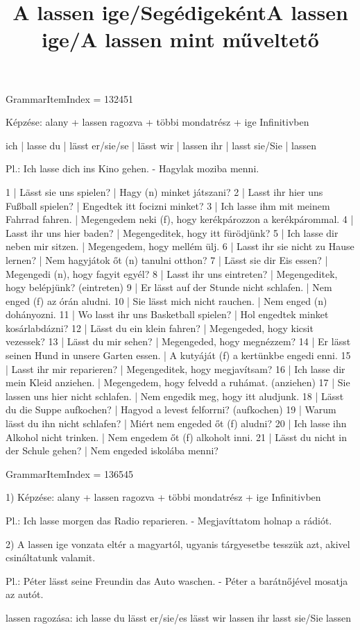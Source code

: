 \title{A lassen ige/Segédigeként}

GrammarItemIndex = 132451

\begin{desc}
Képzése:
alany + lassen ragozva + többi mondatrész + ige Infinitivben

ich       | lasse
du        | lässt
er/sie/se | lässt
wir       | lassen
ihr       | lasst
sie/Sie   | lassen

Pl.: Ich lasse dich ins Kino gehen. - Hagylak moziba menni.
\end{desc}

\begin{exmp}
1 | Lässt sie uns spielen? | Hagy (n) minket játszani?
2 | Lasst ihr hier uns Fußball spielen? | Engedtek itt focizni minket?
3 | Ich lasse ihm mit meinem Fahrrad fahren. | Megengedem neki (f), hogy kerékpározzon a kerékpárommal.
4 | Lasst ihr uns hier baden? | Megengeditek, hogy itt fürödjünk?
5 | Ich lasse dir neben mir sitzen. | Megengedem, hogy mellém ülj.
6 | Lasst ihr sie nicht zu Hause lernen? | Nem hagyjátok őt (n) tanulni otthon?
7 | Lässt sie dir Eis essen? | Megengedi (n), hogy fagyit egyél?
8 | Lasst ihr uns eintreten? | Megengeditek, hogy belépjünk? (eintreten)
9 | Er lässt auf der Stunde nicht schlafen. | Nem enged (f) az órán aludni.
10 | Sie lässt mich nicht rauchen. | Nem enged (n) dohányozni.
11 | Wo lasst ihr uns Basketball spielen? | Hol engedtek minket kosárlabdázni?
12 | Lässt du ein klein fahren? | Megengeded, hogy kicsit vezessek?
13 | Lässt du mir sehen? | Megengeded, hogy megnézzem?
14 | Er lässt seinen Hund in unsere Garten essen. | A kutyáját (f) a kertünkbe engedi enni.
15 | Lasst ihr mir reparieren? | Megengeditek, hogy megjavítsam?
16 | Ich lasse dir mein Kleid anziehen. | Megengedem, hogy felvedd a ruhámat. (anziehen)
17 | Sie lassen uns hier nicht schlafen. | Nem engedik meg, hogy itt aludjunk.
18 | Lässt du die Suppe aufkochen? | Hagyod a levest felforrni? (aufkochen)
19 | Warum lässt du ihn nicht schlafen? | Miért nem engeded őt (f) aludni?
20 | Ich lasse ihn Alkohol nicht trinken. | Nem engedem őt (f) alkoholt inni.
21 | Lässt du nicht in der Schule gehen? | Nem engeded iskolába menni?
\end{exmp}

\title{A lassen ige/A lassen mint műveltető}

GrammarItemIndex = 136545

\begin{desc}
1) Képzése: alany + lassen ragozva + többi mondatrész + ige Infinitivben 

Pl.: Ich lasse morgen das Radio reparieren. - Megjavíttatom holnap a rádiót.

2) A lassen ige vonzata eltér a magyartól, ugyanis tárgyesetbe tesszük
azt, akivel csináltatunk valamit.

Pl.: Péter lässt seine Freundin das Auto waschen. - Péter a barátnőjével mosatja az autót.

lassen ragozása:
ich lasse
du lässt
er/sie/es lässt
wir lassen
ihr lasst
sie/Sie lassen
\end{desc}


